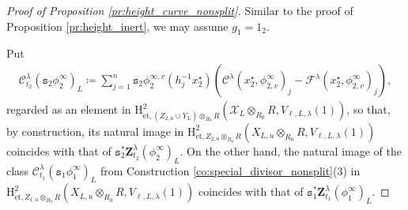 \documentclass[12pt]{amsart}
\numberwithin{equation}{section}
\theoremstyle{plain}
\theoremstyle{definition}
\theoremstyle{remark}
\renewcommand{\c}[1]{\mathcal{#1}}
\renewcommand{\r}[1]{\mathrm{#1}}
\renewcommand{\(}{\left(}
\renewcommand{\)}{\right)}
\newcommand{\cC}{\c C}
\newcommand{\cF}{\c F}
\newcommand{\cX}{\c X}
\newcommand{\rH}{\r H}
\newcommand{\ts}{\mathtt{s}}
\newcommand{\bbZ}{\boldsymbol{Z}}
\newcommand{\et}{{\acute{\r{e}}\r{t}}}
\begin{document}
\begin{proof}[Proof of Proposition \ref{pr:height_curve_nonsplit}]
Similar to the proof of Proposition \ref{pr:height_inert}, we may assume $g_1=1_2$.

Put
\begin{align}\label{eq:height_curve_nonsplit_3}
\cC^\lambda_{t_2}(\ts_2\phi^\infty_2)_L\coloneqq\sum_{j=1}^n\ts_2\phi^{\infty,v}_2(h_j^{-1}x^\star_2)
\(\cC^\lambda(x^\star_2,\phi^\infty_{2,v})_j-\cF^\lambda(x^\star_2,\phi^\infty_{2,v})_j\),
\end{align}
regarded as an element in $\rH^2_{\et,(Z_{2,u}\cup Y_L)\otimes_{R_0}R}(\cX_L\otimes_{R_0}R,V_{\ell,L,\lambda}(1))$, so that, by construction, its natural image in $\rH^2_{\et,Z_{2,u}\otimes_{R_0}R}(X_{L,u}\otimes_{R_0}R,V_{\ell,L,\lambda}(1))$ coincides with that of $\ts_2^*\bbZ^\lambda_{t_2}(\phi^\infty_2)_L$. On the other hand, the natural image of the class $\cC^\lambda_{t_1}(\ts_1\phi^\infty_1)_L$ from Construction \ref{co:special_divisor_nonsplit}(3) in $\rH^2_{\et,Z_{1,u}\otimes_{R_0}R}(X_{L,u}\otimes_{R_0}R,V_{\ell,L,\lambda}(1))$ coincides with that of $\ts_1^*\bbZ^\lambda_{t_1}(\phi^\infty_1)_L$.


\end{proof}
\end{document}
